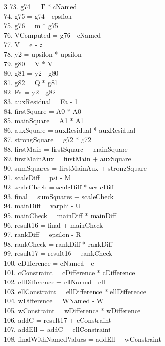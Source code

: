 \documentclass[10pt]{article}
\begin{document}
\begin{multicols}{3}
73. g74 = T * cNamed\\
74. g75 = g74 - epsilon\\
75. g76 = m * g75\\
76. VComputed = g76 - cNamed\\
77. V = e - z\\
78. y2 = upsilon * upsilon\\
79. g80 = V * V\\
80. g81 = y2 - g80\\
81. g82 = Q * g81\\
82. Fa = y2 - g82\\
83. auxResidual = Fa - 1\\
84. firstSquare = A0 * A0\\
85. mainSquare = A1 * A1\\
86. auxSquare = auxResidual * auxResidual\\
87. strongSquare = g72 * g72\\
88. firstMain = firstSquare + mainSquare\\
89. firstMainAux = firstMain + auxSquare\\
90. sumSquares = firstMainAux + strongSquare\\
91. scaleDiff = psi - M\\
92. scaleCheck = scaleDiff * scaleDiff\\
93. final = sumSquares + scaleCheck\\
94. mainDiff = varphi - U\\
95. mainCheck = mainDiff * mainDiff\\
96. result16 = final + mainCheck\\
97. rankDiff = epsilon - R\\
98. rankCheck = rankDiff * rankDiff\\
99. result17 = result16 + rankCheck\\
100. cDifference = cNamed - c\\
101. cConstraint = cDifference * cDifference\\
102. ellDifference = ellNamed - ell\\
103. ellConstraint = ellDifference * ellDifference\\
104. wDifference = WNamed - W\\
105. wConstraint = wDifference * wDifference\\
106. addC = result17 + cConstraint\\
107. addEll = addC + ellConstraint\\
108. finalWithNamedValues = addEll + wConstraint\\

\end{multicols}
\end{document}
